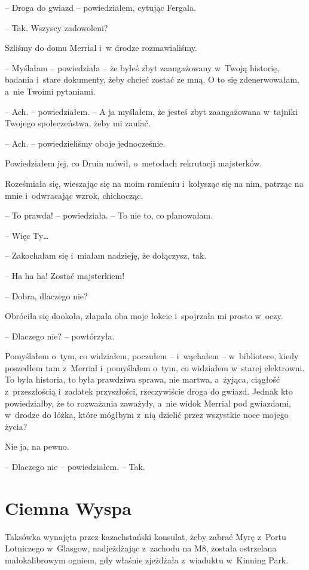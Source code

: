 \documentclass[oneside,polish,11pt,sfheadings]{mwbk}
\begin{document}
-- Droga do gwiazd -- powiedziałem, cytując Fergala.

-- Tak. Wszyscy zadowoleni?

Szliśmy do domu Merrial i~w drodze rozmawialiśmy.

-- Myślałam -- powiedziała -- że byłeś zbyt zaangażowany w~Twoją historię,
badania i~stare dokumenty, żeby chcieć zostać ze mną. O to się
zdenerwowałam, a~nie Twoimi pytaniami.

-- Ach. -- powiedziałem. -- A ja myślałem, że jesteś zbyt zaangażowana w~tajniki Twojego społeczeństwa, żeby mi zaufać.

-- Ach. -- powiedzieliśmy oboje jednocześnie.

Powiedziałem jej, co Druin mówił, o~metodach rekrutacji majsterków.

Roześmiała się, wieszając się na moim ramieniu i~kołysząc się na nim,
patrząc na mnie i~odwracając wzrok, chichocząc.

-- To prawda! -- powiedziała. -- To nie to, co planowałam.

-- Więc Ty\ldots

-- Zakochałam się i~miałam nadzieję, że dołączysz, tak.

-- Ha ha ha! Zostać majsterkiem!

-- Dobra, dlaczego nie?

Obróciła się dookoła, złapała oba moje łokcie i~spojrzała mi prosto w~oczy.

-- Dlaczego nie? -- powtórzyła.

Pomyślałem o~tym, co widziałem, poczułem -- i~wąchałem -- w~bibliotece,
kiedy poszedłem tam z~Merrial i~pomyślałem o~tym, co widziałem w~starej
elektrowni. To była historia, to była prawdziwa sprawa, nie martwa, a~żyjąca, ciągłość z~przeszłością i~zadatek przyszłości, rzeczywiście
droga do gwiazd. Jednak kto powiedziałby, że to rozważania zaważyły, a~nie widok Merrial pod gwiazdami, w~drodze do łóżka, które mógłbym z~nią
dzielić przez wszystkie noce mojego życia?

Nie ja, na pewno.

-- Dlaczego nie -- powiedziałem. -- Tak.


\chapter{Ciemna Wyspa}

Taksówka wynajęta przez kazachstański konsulat, żeby zabrać Myrę z~Portu
Lotniczego w~Glasgow, nadjeżdżając z~zachodu na M8, została ostrzelana
małokalibrowym ogniem, gdy właśnie zjeżdżała z~wiaduktu w~Kinning Park.
\end{document}

